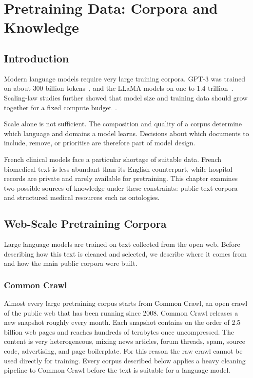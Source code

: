 \chapter{Pretraining Data: Corpora and Knowledge}
\label{chap:rw-corpus}



\section{Introduction}
\label{sec:corpus-intro}

Modern language models require very large training corpora. GPT-3 was trained on
about 300 billion tokens~\citep{gpt3}, and the LLaMA models on one to 1.4
trillion~\citep{touvron2023llama}. Scaling-law studies further showed that model
size and training data should grow together for a fixed compute
budget~\citep{chinchilla_scaling}.

Scale alone is not sufficient. The composition and quality of a corpus determine
which language and domains a model learns. Decisions about which documents to
include, remove, or prioritise are therefore part of model design.

French clinical models face a particular shortage of suitable data. French
biomedical text is less abundant than its English counterpart, while hospital
records are private and rarely available for pretraining. This chapter examines
two possible sources of knowledge under these constraints: public text corpora
and structured medical resources such as ontologies.
\section{Web-Scale Pretraining Corpora}
\label{sec:corpus-web}

Large language models are trained on text collected from the open web. Before describing
how this text is cleaned and selected, we describe where it comes from and how the main
public corpora were built.

\subsection{Common Crawl}

Almost every large pretraining corpus starts from Common Crawl, an open crawl of the public
web that has been running since 2008. Common Crawl releases a new snapshot roughly every
month. Each snapshot contains on the order of 2.5 billion web pages and reaches hundreds of
terabytes once uncompressed. The content is very heterogeneous, mixing news articles, forum
threads, spam, source code, advertising, and page boilerplate. For this reason the raw
crawl cannot be used directly for training. Every corpus described below applies a heavy
cleaning pipeline to Common Crawl before the text is suitable for a language model.

